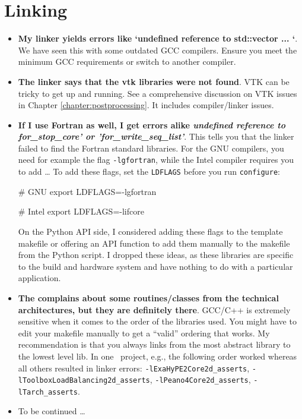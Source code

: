 \section{Linking}

\begin{itemize}
  \item \textbf{My linker yields errors like `undefined reference to
  std::vector ...  `}.
  We have seen this with some outdated GCC compilers. Ensure you meet the
  minimum GCC requirements or switch to another compiler.
  \item \textbf{The linker says that the vtk libraries were not found}.
  VTK can be tricky to get up and running. See a comprehensive discussion on VTK
  issues in Chapter \ref{chapter:postprocessing}. It includes compiler/linker issues.
  \item \textbf{If I use Fortran as well, I get errors alike \emph{undefined
  reference to for\_stop\_core' or 'for\_write\_seq\_list'}}. This tells you
  that the linker failed to find the Fortran standard libraries. For the GNU
  compilers, you need for example the flag \texttt{-lgfortran}, while the Intel
  compiler requires you to add \ldots
  To add these flags, set the \texttt{LDFLAGS} before you run
  \texttt{configure}:
  \begin{code}
# GNU
export LDFLAGS=-lgfortran

# Intel
export LDFLAGS=-lifcore
  \end{code}
  On the Python API side, I considered adding these flags to the template
  makefile or offering an API function to add them manually to the makefile from
  the Python script. I dropped these ideas, as these libraries are specific to
  the build and hardware system and have nothing to do with a particular
  application.
  \item \textbf{The complains about some routines/classes from the technical
  architectures, but they are definitely there}.
  GCC/C++ is extremely sensitive when it comes to the order of the libraries
  used. You might have to edit your makefile manually to get a ``valid''
  ordering that works. My recommendation is that you always links from the most
  abstract library to the lowest level lib. In one \ExaHyPE\ project, e.g., the
  following order worked whereas all others resulted in linker errors:
  \texttt{-lExaHyPE2Core2d\_asserts},
  \texttt{-lToolboxLoadBalancing2d\_asserts}, \texttt{-lPeano4Core2d\_asserts},
  \texttt{-lTarch\_asserts}.
  \item To be continued \dots
\end{itemize}




